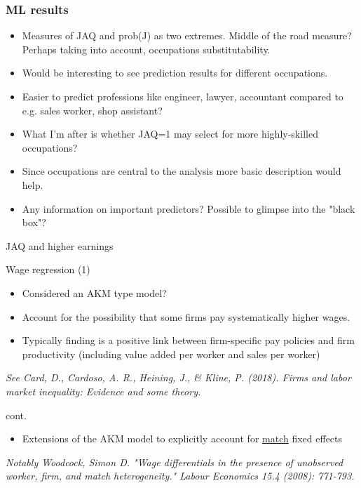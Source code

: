 \documentclass[usenames,dvipsnames,10pt]{beamer}
\begin{document}
\begin{frame} 
\frametitle{ML results} 
\begin{itemize}
    \item Measures of JAQ and prob(J) as two extremes. Middle of the road measure? Perhaps taking into account, occupations substitutability.
    \item Would be interesting to see prediction results for different occupations.
    \item Easier to predict professions like engineer, lawyer, accountant compared to e.g. sales worker, shop assistant? 
    \item What I'm after is whether JAQ=1 may select for more highly-skilled occupations?
    \item Since occupations are central to the analysis more basic description would help.
    \item Any information on important predictors? Possible to glimpse into the "black box"?
   \end{itemize}
\end{frame}

\begin{frame}{JAQ and higher earnings}
\begin{exampleblock}{Wage regression (1)}
\end{exampleblock}
\begin{itemize}
\item Considered an AKM type model?
\item Account for the possibility that some firms pay systematically higher wages.
\item Typically finding is a positive link between firm-specific pay policies and firm productivity (including value added per worker and sales per worker) 
\end{itemize}
\emph{\small See Card, D., Cardoso, A. R., Heining, J., \& Kline, P. (2018). Firms and labor market inequality: Evidence and some theory.}
\end{frame}

\begin{frame}{cont.} 
\begin{itemize}
\item Extensions of the AKM model to explicitly account for \underline{match} fixed effects
\end{itemize}
\emph{\small Notably Woodcock, Simon D. "Wage differentials in the presence of unobserved worker, firm, and match heterogeneity." Labour Economics 15.4 (2008): 771-793.}
\end{frame}
\end{document}
